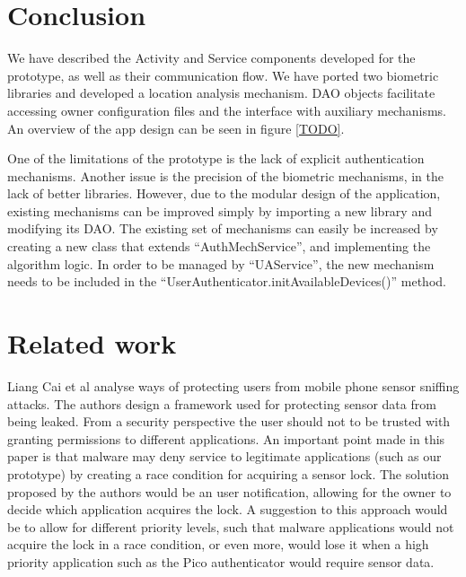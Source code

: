 \section{Conclusion}
We have described the Activity and Service components developed for the prototype, as well as their communication flow. We have ported two biometric libraries and developed a location analysis mechanism. DAO objects facilitate accessing owner configuration files and the interface with auxiliary mechanisms. An overview of the app design can be seen in figure \ref{TODO}.


One of the limitations of the prototype is the lack of explicit authentication mechanisms. Another issue is the precision of the biometric mechanisms, in the lack of better libraries. However, due to the modular design of the application, existing mechanisms can be improved simply by importing a new library and modifying its DAO. The existing set of mechanisms can easily be increased by creating a new class that extends ``AuthMechService'', and implementing the algorithm logic. In order to be managed by ``UAService'', the new mechanism needs to be included in the ``UserAuthenticator.initAvailableDevices()'' method.

\section{Related work}
Liang Cai et al \cite{cai2009defending} analyse ways of protecting users from mobile phone sensor sniffing attacks. The authors design a framework used for protecting sensor data from being leaked. From a security perspective the user should not to be trusted with granting permissions to different applications. An important point made in this paper is that malware may deny service to legitimate applications (such as our prototype) by creating a race condition for acquiring a sensor lock. The solution proposed by the authors would be an user notification, allowing for the owner to decide which application acquires the lock. A suggestion to this approach would be to allow for different priority levels, such that malware applications would not acquire the lock in a race condition, or even more, would lose it when a high priority application such as the Pico authenticator would require sensor data.

